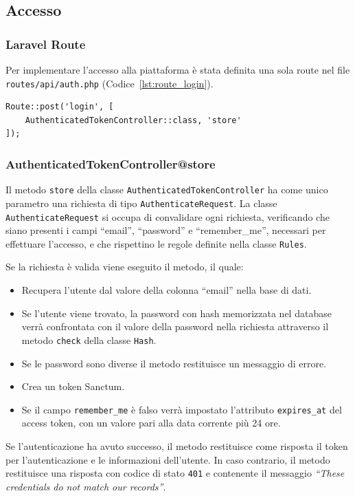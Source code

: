 \subsection{Accesso}
\subsubsection{Laravel Route}
Per implementare l'accesso alla piattaforma \`e stata definita una sola route nel file \verb|routes/api/auth.php|  (Codice~\ref{lst:route_login}).
\\
\begin{lstlisting}[caption={Route per l'accesso}, label={lst:route_login}]
Route::post('login', [
	AuthenticatedTokenController::class, 'store'
]);
\end{lstlisting}
\subsubsection{AuthenticatedTokenController@store}
Il metodo \verb|store| della classe \verb|AuthenticatedTokenController| ha come unico parametro una richiesta di tipo \verb|AuthenticateRequest|. La classe \verb|AuthenticateRequest| si occupa di convalidare ogni richiesta, verificando che siano presenti i campi ``email'', ``password'' e ``remember\_me'', necessari per effettuare l'accesso, e che rispettino le regole definite nella classe \verb|Rules|.

Se la richiesta \`e valida viene eseguito il metodo, il quale:
\begin{itemize}
	\item Recupera l'utente dal valore della colonna ``email'' nella base di dati.
	\item Se l'utente viene trovato, la password con hash memorizzata nel database verr\`a confrontata con il valore della password nella richiesta attraverso il metodo \verb|check| della classe \verb|Hash|.
	\item Se le password sono diverse il metodo restituisce un messaggio di errore.
	\item Crea un token Sanctum.
	\item Se il campo \verb|remember_me| \`e falso verr\`a impostato l'attributo \verb|expires_at| del access token, con un valore pari alla data corrente pi\`u 24 ore.
\end{itemize} 

Se l'autenticazione ha avuto successo, il metodo restituisce come risposta il token per l'autenticazione e le informazioni dell'utente. In caso contrario, il metodo restituisce una risposta con codice di stato \verb|401| e contenente il messaggio \textit{``These credentials do not match our records''}.

